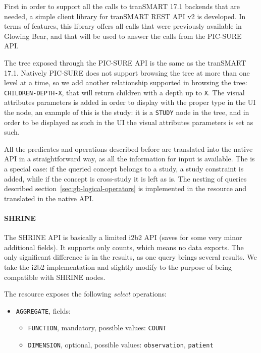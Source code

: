 First in order to support all the calls to tranSMART 17.1 backends that are needed, a simple client library for tranSMART REST API v2 is developed.
In terms of features, this library offers all calls that were previously available in Glowing Bear, and that will be used to answer the calls from the PIC-SURE API.

The tree exposed through the PIC-SURE API is the same as the tranSMART 17.1.
Natively PIC-SURE does not support browsing the tree at more than one level at a time, so we add another relationship supported in browsing the tree: \verb|CHILDREN-DEPTH-X|, that will return children with a depth up to \verb|X|.
The visual attributes parameters is added in order to display with the proper type in the UI the node, an example of this is the study: it is a \verb|STUDY| node in the tree, and in order to be displayed as such in the UI the visual attributes parameters is set as such.

All the predicates and operations described before are translated into the native API in a straightforward way, as all the information for input is available.
The is a special case: if the queried concept belongs to a study, a study constraint is added, while if the concept is cross-study it is left as is.
The nesting of queries described section~\ref{sec:gb-logical-operators} is implemented in the resource and translated in the native API.


\paragraph{SHRINE}
The SHRINE API is basically a limited i2b2 API (saves for some very minor additional fields).
It supports only counts, which means no data exports.
The only significant difference is in the results, as one query brings several results.
We take the i2b2 implementation and slightly modify to the purpose of being compatible with SHRINE nodes.

The resource exposes the following \emph{select} operations:
\begin{itemize}
    \item \verb|AGGREGATE|, fields:
    \begin{itemize}
        \item \verb|FUNCTION|, mandatory, possible values:
        \verb|COUNT|
        
        \item \verb|DIMENSION|, optional, possible values:
        \verb|observation|,
        \verb|patient|
    \end{itemize}
\end{itemize}

